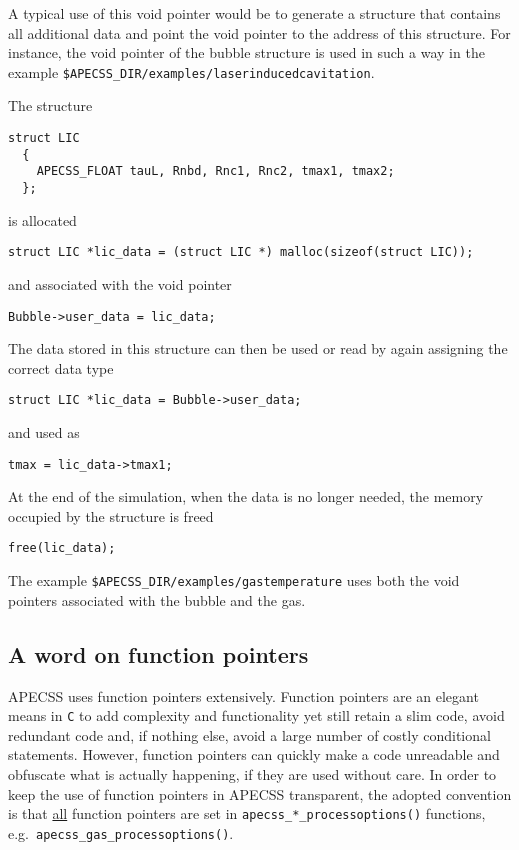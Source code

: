 A typical use of this void pointer would be to generate a structure that contains all additional data and point the void pointer to the address of this structure. For instance, the void pointer of the bubble structure is used in such a way in the example {\tt \$APECSS\_DIR/examples/laserinducedcavitation}. 
\begin{minipage}{\textwidth}
The structure
\begin{lstlisting}[style=CStyle,numbers=none]
  struct LIC
  {
    APECSS_FLOAT tauL, Rnbd, Rnc1, Rnc2, tmax1, tmax2;
  };
\end{lstlisting}\end{minipage}
is allocated
\begin{lstlisting}[style=CStyle,numbers=none]
  struct LIC *lic_data = (struct LIC *) malloc(sizeof(struct LIC));
\end{lstlisting}\vspace{-0.75em}
and associated with the void pointer
\begin{lstlisting}[style=CStyle,numbers=none]
  Bubble->user_data = lic_data;
\end{lstlisting}\vspace{-0.75em}
The data stored in this structure can then be used or read by again assigning the correct data type
\begin{lstlisting}[style=CStyle,numbers=none]
  struct LIC *lic_data = Bubble->user_data;
\end{lstlisting}\vspace{-0.75em}
and used as
\begin{lstlisting}[style=CStyle,numbers=none]
  tmax = lic_data->tmax1;
\end{lstlisting}\vspace{-0.75em}
At the end of the simulation, when the data is no longer needed, the memory occupied by the structure is freed
\begin{lstlisting}[style=CStyle,numbers=none]
  free(lic_data);
\end{lstlisting}%

The example {\tt \$APECSS\_DIR/examples/gastemperature} uses both the void pointers associated with the bubble and the gas.

\subsection{A word on function pointers}

APECSS uses function pointers extensively. Function pointers are an elegant means in {\tt C} to add complexity and functionality yet still retain a slim code, avoid redundant code and, if nothing else, avoid a large number of costly conditional statements. However, function pointers can quickly make a code unreadable and obfuscate what is actually happening, if they are used without care. In order to keep the use of function pointers in APECSS transparent, the adopted convention is that \uline{all} function pointers are set in {\tt apecss\_*\_processoptions()} functions, e.g.~{\tt apecss\_gas\_processoptions()}.

